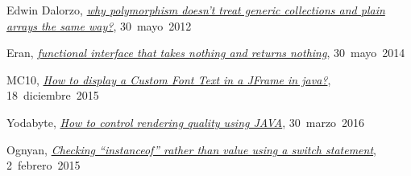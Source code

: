 Edwin Dalorzo,
\href{https://stackoverflow.com/a/10816632}{\textit{why polymorphism doesn't treat generic collections and plain arrays the same way?}},
\mbox{30 mayo 2012}

Eran,
\href{https://stackoverflow.com/a/23958916}{\textit{functional interface that takes nothing and returns nothing}},
\mbox{30 mayo 2014}

MC10,
\href{https://stackoverflow.com/a/34347830}{\textit{How to display a Custom Font Text in a JFrame in java?}},
\mbox{18 diciembre 2015}

Yodabyte,
\href{https://stackoverflow.com/a/36316937}{\textit{How to control rendering quality using JAVA}},
\mbox{30 marzo 2016}

Ognyan,
\href{https://softwareengineering.stackexchange.com/a/271877}{\textit{Checking “instanceof” rather than value using a switch statement}},
\mbox{2 febrero 2015}